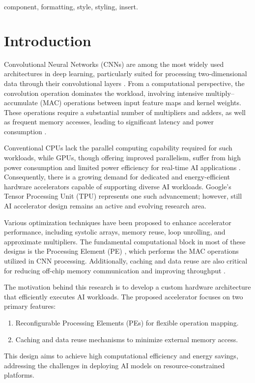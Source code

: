 \documentclass[conference]{IEEEtran}
\begin{document}
\begin{IEEEkeywords}
component, formatting, style, styling, insert.
\end{IEEEkeywords}

\section{Introduction}
\label{sec:intro}
Convolutional Neural Networks (CNNs) are among the most widely used architectures in deep learning, particularly suited for processing two-dimensional data through their convolutional layers \cite{CIACON2025_Optimizing_CNN}. From a computational perspective, the convolution operation dominates the workload, involving intensive multiply–accumulate (MAC) operations between input feature maps and kernel weights. These operations require a substantial number of multipliers and adders, as well as frequent memory accesses, leading to significant latency and power consumption \cite{ISCAS2025_Weight_Approximation_and_Data_Reuse}.

Conventional CPUs lack the parallel computing capability required for such workloads, while GPUs, though offering improved parallelism, suffer from high power consumption and limited power efficiency for real-time AI applications \cite{ICCSP2025_Edge_AI}. Consequently, there is a growing demand for dedicated and energy-efficient hardware accelerators capable of supporting diverse AI workloads. Google’s Tensor Processing Unit (TPU) represents one such advancement; however, still AI accelerator design remains an active and evolving research area.

Various optimization techniques have been proposed to enhance accelerator performance, including systolic arrays, memory reuse, loop unrolling, and approximate multipliers. The fundamental computational block in most of these designs is the Processing Element (PE) \cite{Usman2025}, which performs the MAC operations utilized in CNN processing. Additionally, caching and data reuse are also critical for reducing off-chip memory communication and improving throughput \cite{ISCAS2025_Weight_Approximation_and_Data_Reuse}.

The motivation behind this research is to develop a custom hardware architecture that efficiently executes AI workloads. The proposed accelerator focuses on two primary features:
\begin{enumerate}
    \item Reconfigurable Processing Elements (PEs) for flexible operation mapping.  
    \item Caching and data reuse mechanisms to minimize external memory access.  
\end{enumerate}
This design aims to achieve high computational efficiency and energy savings, addressing the challenges in deploying AI models on resource-constrained platforms.
\end{document}
